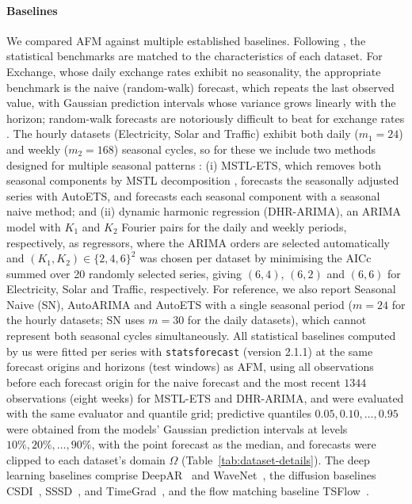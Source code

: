 \documentclass[preprint,12pt,authoryear]{elsarticle}
\newcommand{\oldrev}[1]{#1}
\newcommand{\rev}[1]{#1}
\newcommand{\rev}[1]{\textcolor{blue}{#1}}
\begin{document}
\paragraph{Baselines} We compared AFM against multiple established baselines. \rev{Following \citet{hewamalage2023forecast}, the statistical benchmarks are matched to the characteristics of each dataset. For Exchange, whose daily exchange rates exhibit no seasonality, the appropriate benchmark is the naive (random-walk) forecast, which repeats the last observed value, with Gaussian prediction intervals whose variance grows linearly with the horizon; random-walk forecasts are notoriously difficult to beat for exchange rates \citep{meese1983empirical}. The hourly datasets (Electricity, Solar and Traffic) exhibit both daily ($m_1=24$) and weekly ($m_2=168$) seasonal cycles, so for these we include two methods designed for multiple seasonal patterns \citep{hyndman2025fpppy}: (i) MSTL-ETS, which removes both seasonal components by MSTL decomposition \citep{bandara2025mstl}, forecasts the seasonally adjusted series with AutoETS, and forecasts each seasonal component with a seasonal naive method; and (ii) dynamic harmonic regression (DHR-ARIMA), an ARIMA model with $K_1$ and $K_2$ Fourier pairs for the daily and weekly periods, respectively, as regressors, where the ARIMA orders are selected automatically and $(K_1, K_2) \in \{2, 4, 6\}^2$ was chosen per dataset by minimising the AICc summed over 20 randomly selected series, giving $(6, 4)$, $(6, 2)$ and $(6, 6)$ for Electricity, Solar and Traffic, respectively. For reference, we also report Seasonal Naive (SN), AutoARIMA and AutoETS \citep{hyndman2008forecasting} with a single seasonal period ($m=24$ for the hourly datasets; SN uses $m=30$ for the daily datasets), which cannot represent both seasonal cycles simultaneously. All statistical baselines computed by us were fitted per series with \texttt{statsforecast} (version 2.1.1) \citep{garza2022statsforecast} at the same forecast origins and horizons (test windows) as AFM, using all observations before each forecast origin for the naive forecast and the most recent $1344$ observations (eight weeks) for MSTL-ETS and DHR-ARIMA, and were evaluated with the same evaluator and quantile grid; predictive quantiles $0.05, 0.10, \ldots, 0.95$ were obtained from the models' Gaussian prediction intervals at levels $10\%, 20\%, \ldots, 90\%$, with the point forecast as the median, and forecasts were clipped to each dataset's domain $\Omega$ (Table~\ref{tab:dataset-details}).}
The deep learning baselines comprise DeepAR~\citep{salinas2020deepar} and WaveNet~\citep{van2016wavenet}\rev{, the} diffusion baselines \oldrev{CSDI~\citep{tashiro2021csdi},} SSSD~\citep{alcaraz2022diffusion}, and TimeGrad~\citep{rasul2021autoregressive}\rev{, and the} flow matching baseline TSFlow~\citep{Kerrigan2024Flow}.
\end{document}
